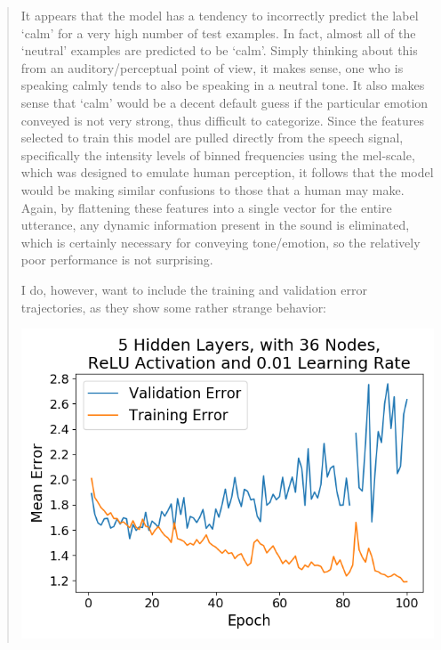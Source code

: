 \documentclass{article}
\begin{document}
\begin{quote}
	It appears that the model has a tendency to incorrectly predict the label `calm' for a very high number of test examples. In fact, almost all of the `neutral' examples are predicted to be `calm'. Simply thinking about this from an auditory/perceptual point of view, it makes sense, one who is speaking calmly tends to also be speaking in a neutral tone. It also makes sense that `calm' would be a decent default guess if the particular emotion conveyed is not very strong, thus difficult to categorize. Since the features selected to train this model are pulled directly from the speech signal, specifically the intensity levels of binned frequencies using the mel-scale, which was designed to emulate human perception, it follows that the model would be making similar confusions to those that a human may make. Again, by flattening these features into a single vector for the entire utterance, any dynamic information present in the sound is eliminated, which is certainly necessary for conveying tone/emotion, so the relatively poor performance is not surprising.
	
	I do, however, want to include the training and validation error trajectories, as they show some rather strange behavior:
	
		\begin{center}
		\includegraphics[scale=0.4]{figs/Emotions_Initial_Best_Cost.png}
	\end{center}


\end{quote}
\end{document}
